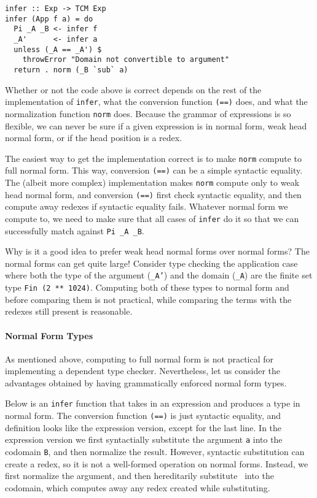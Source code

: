 \documentclass[preprint,authoryear]{sigplanconf}
\begin{document}
\begin{verbatim}
infer :: Exp -> TCM Exp
infer (App f a) = do
  Pi _A _B <- infer f
  _A'      <- infer a
  unless (_A == _A') $
    throwError "Domain not convertible to argument"
  return . norm (_B `sub` a)
\end{verbatim}

Whether or not the code above is correct depends on the rest of the
implementation of \texttt{infer}, what the conversion function
\texttt{(==)} does, and what the normalization function
\texttt{norm} does. Because the grammar of expressions is so flexible,
we can never be sure if a given expression is in normal form,
weak head normal form, or if the head position is a redex.

The easiest way to get the implementation correct is to make
\texttt{norm} compute to full normal form. This way,
conversion \texttt{(==)} can be a simple syntactic equality. The
(albeit more complex) implementation makes \texttt{norm} compute only
to weak head normal form, and conversion \texttt{(==)} first check
syntactic equality, and then compute away redexes if syntactic
equality fails. Whatever normal form we compute to, we need to make
sure that all cases of \texttt{infer} do it so that we can
successfully match against \texttt{Pi \_A \_B}.

Why is it a good idea to prefer weak head normal forms over normal
forms? The normal forms can get quite large! Consider type checking
the application case where both the type of the argument (\texttt{\_A'})
and the domain (\texttt{\_A}) are the finite set type
\texttt{Fin (2 ** 1024)}. Computing both of these types to normal form
and before comparing them is not practical, while comparing the
terms with the redexes still present is reasonable.

\paragraph{Normal Form Types}

As mentioned above, computing to full normal form is not practical for
implementing a dependent type checker. Nevertheless, let us consider
the advantages obtained by having grammatically enforced normal form
types.

Below is an \texttt{infer} function that takes in an expression
and produces a type in normal form. The conversion function
\texttt{(==)} is just syntactic equality, and definition looks like
the expression version, except for the last line. In the expression
version we first syntactially substitute the argument \texttt{a} into
the codomain \texttt{B}, and then normalize the result. However,
syntactic substitution can create a redex, so it is not a well-formed
operation on normal forms. Instead, we first normalize the argument,
and then hereditarily substitute~\cite{TODO} into the codomain, which
computes away any redex created while substituting.
\end{document}

